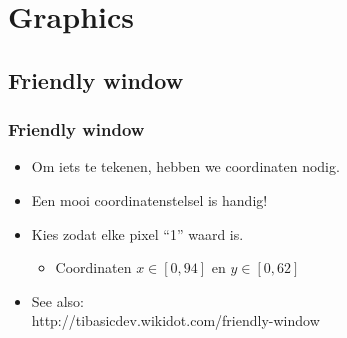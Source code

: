 \section{Graphics}

\subsection{Friendly window}

\begin{frame}
\frametitle{Friendly window}


\begin{itemize}
  \item<1-> Om iets te tekenen, hebben we coordinaten nodig.
  \item<2-> Een mooi coordinatenstelsel is handig!
  \item<3-> Kies zodat elke pixel ``1'' waard is.
  \begin{itemize}
    \item<4-> Coordinaten $x\in[0,94]$ en $y\in[0,62]$
  \end{itemize}
  \item<7-> See also: \\
  	http://tibasicdev.wikidot.com/friendly-window
\end{itemize}

\vspace{3cm}


\end{frame}
